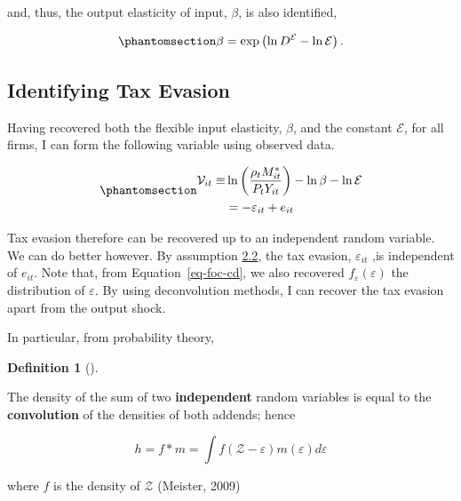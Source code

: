 \documentclass[
  12pt]{article}
\theoremstyle{definition}
\newtheorem{definition}{Definition}[section]
\theoremstyle{remark}
\newenvironment{fbx}[3]{\begin{tcolorbox}[enhanced, breakable,%
attach boxed title to top*={xshift=1.4pt},
boxed title style={boxrule=0.0mm, fuzzy shadow={1pt}{-1pt}{0mm}{0.1mm}{gray}, arc=.3em, rounded corners=east, sharp corners=west}, colframe=#1-color2, colbacktitle=#1-color1, colback = white, coltitle=black,  titlerule=0mm, toprule=0pt, bottomrule=.7pt, leftrule=.3em, rightrule=0pt, outer arc=.3em,  arc=0pt,	 sharp corners = east, left=.5em, bottomtitle=1mm, toptitle=1mm,title=\textbf{#2}\hspace{0.5em}{#3}]}
{\end{tcolorbox}}
\begin{document}
and, thus, the output elasticity of input, \(\beta\), is also
identified,

\begin{equation}\phantomsection\label{eq-id-beta}{
\beta=\exp\left(\ln D^{\mathcal{E}}-\ln\mathcal{E}\right).
}\end{equation}

\subsection{Identifying Tax Evasion}\label{identifying-tax-evasion}

Having recovered both the flexible input elasticity, \(\beta\), and the
constant \(\mathcal{E}\), for all firms, I can form the following
variable using observed data.

\begin{equation}\phantomsection\label{eq-ob-ev}{
\begin{aligned}
    \mathcal V_{it}\equiv&\ln\left(\frac{\rho_t M^*_{it}}{P_{t}Y_{it}}\right)-\ln\beta -\ln\mathcal{E}\notag \\
    &=-\varepsilon_{it} +e_{it}
\end{aligned}
}\end{equation}

Tax evasion therefore can be recovered up to an independent random
variable. We can do better however. By assumption
\hyperref[ass-ind]{2.2}, the tax evasion, \(\varepsilon_{it}\) ,is
independent of \(e_{it}\). Note that, from Equation~\ref{eq-foc-cd}, we
also recovered \(f_{\varepsilon}(\varepsilon)\) the distribution of
\(\varepsilon\). By using deconvolution methods, I can recover the tax
evasion apart from the output shock.

In particular, from probability theory,

\begin{definition}[]\protect\hypertarget{def-conv}{}\label{def-conv}

\begin{fbx}{Definition}{Definition: }{Convolution}
\label{}
The density of the sum of two \textbf{independent} random variables is
equal to the \textbf{convolution} of the densities of both addends;
hence

\[
h = f*m = \int f(\mathcal Z - \varepsilon)m(\varepsilon)d\varepsilon
\]

where \(f\) is the density of \(\mathcal Z\) (Meister, 2009)

\end{fbx}

\end{definition}
\end{document}
